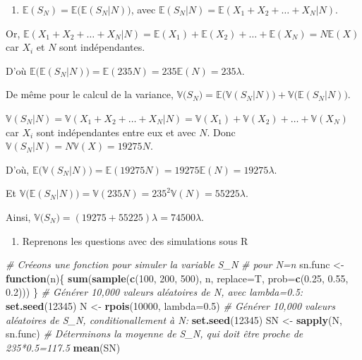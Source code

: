 \documentclass[
]{book}
\newenvironment{Shaded}{\begin{snugshade}}{\end{snugshade}}
\newcommand{\CommentTok}[1]{\textcolor[rgb]{0.56,0.35,0.01}{\textit{#1}}}
\newcommand{\ControlFlowTok}[1]{\textcolor[rgb]{0.13,0.29,0.53}{\textbf{#1}}}
\newcommand{\DataTypeTok}[1]{\textcolor[rgb]{0.13,0.29,0.53}{#1}}
\newcommand{\DecValTok}[1]{\textcolor[rgb]{0.00,0.00,0.81}{#1}}
\newcommand{\FloatTok}[1]{\textcolor[rgb]{0.00,0.00,0.81}{#1}}
\newcommand{\KeywordTok}[1]{\textcolor[rgb]{0.13,0.29,0.53}{\textbf{#1}}}
\newcommand{\NormalTok}[1]{#1}
\newcommand{\StringTok}[1]{\textcolor[rgb]{0.31,0.60,0.02}{#1}}
\providecommand{\tightlist}{%
  \setlength{\itemsep}{0pt}\setlength{\parskip}{0pt}}
\theoremstyle{definition}
\theoremstyle{definition}
\theoremstyle{definition}
\theoremstyle{remark}
\begin{document}
\begin{enumerate}
\def\labelenumi{\arabic{enumi}.}
\setcounter{enumi}{1}
\tightlist
\item
  \(\mathbb{E}(S_N)=\mathbb{E}\Big(\mathbb{E}(S_N|N)\Big)\), avec \(\mathbb{E}(S_N|N)=\mathbb{E}(X_1+X_2+\ldots+X_N|N)\).
\end{enumerate}

Or, \(\mathbb{E}(X_1+X_2+\ldots+X_N|N)=\mathbb{E}(X_1)+\mathbb{E}(X_2)+\ldots+\mathbb{E}(X_N)=N\mathbb{E}(X)\) car \(X_i\) et \(N\) sont indépendantes.

D'où \(\mathbb{E}\Big(\mathbb{E}(S_N|N)\Big)=\mathbb{E}(235 N)=235 \mathbb{E}(N)=235 \lambda\).

De même pour le calcul de la variance, \(\mathbb{V}\Big(S_N\Big)=\mathbb{E}\Big(\mathbb{V}(S_N|N) \Big)+\mathbb{V}\Big(\mathbb{E}(S_N|N)\Big)\).

\(\mathbb{V}(S_N|N)=\mathbb{V}(X_1+X_2+\ldots+X_N|N)=\mathbb{V}(X_1)+\mathbb{V}(X_2)+\ldots+\mathbb{V}(X_N)\) car \(X_i\) sont indépendantes entre eux et avec \(N\). Donc \(\mathbb{V}(S_N|N)=N\mathbb{V}(X)=19275 N\).

D'où, \(\mathbb{E}\Big(\mathbb{V}(S_N|N) \Big)=\mathbb{E}(19275 N)=19275 \mathbb{E}(N)=19275 \lambda\).

Et \(\mathbb{V}\Big(\mathbb{E}(S_N|N)\Big)=\mathbb{V}(235N)=235^2\mathbb{V}(N)=55225 \lambda\).

Ainsi, \(\mathbb{V}\Big(S_N\Big)=(19275+55225)\lambda=74500 \lambda\).

\begin{enumerate}
\def\labelenumi{\arabic{enumi}.}
\setcounter{enumi}{2}
\tightlist
\item
  Reprenons les questions avec des simulations sous R
\end{enumerate}

\begin{Shaded}
\begin{Highlighting}[]
\CommentTok{# Créeons une fonction pour simuler la variable S_N}
\CommentTok{# pour N=n}
\NormalTok{ sn.func <-}\StringTok{ }\ControlFlowTok{function}\NormalTok{(n)\{}
\KeywordTok{sum}\NormalTok{(}\KeywordTok{sample}\NormalTok{(}\KeywordTok{c}\NormalTok{(}\DecValTok{100}\NormalTok{, }\DecValTok{200}\NormalTok{, }\DecValTok{500}\NormalTok{), n, }\DataTypeTok{replace=}\NormalTok{T,}
\DataTypeTok{prob=}\KeywordTok{c}\NormalTok{(}\FloatTok{0.25}\NormalTok{, }\FloatTok{0.55}\NormalTok{, }\FloatTok{0.2}\NormalTok{)))}
\NormalTok{\}}
\CommentTok{# Générer 10,000 valeurs aléatoires de N, avec lambda=0.5:}
\KeywordTok{set.seed}\NormalTok{(}\DecValTok{12345}\NormalTok{)}
\NormalTok{ N <-}\StringTok{ }\KeywordTok{rpois}\NormalTok{(}\DecValTok{10000}\NormalTok{, }\DataTypeTok{lambda=}\FloatTok{0.5}\NormalTok{)}
 \CommentTok{# Générer 10,000 valeurs aléatoires de S_N, conditionallement à N:}
 \KeywordTok{set.seed}\NormalTok{(}\DecValTok{12345}\NormalTok{)}
\NormalTok{ SN <-}\StringTok{ }\KeywordTok{sapply}\NormalTok{(N, sn.func)}
\CommentTok{# Déterminons la moyenne de S_N, qui doit être proche de 235*0.5=117.5}
 \KeywordTok{mean}\NormalTok{(SN)}
\end{Highlighting}
\end{Shaded}
\end{document}
